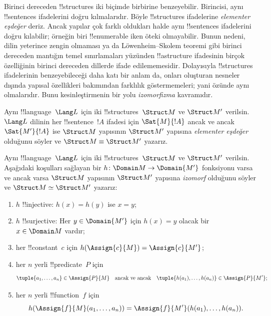 \documentclass[../../../include/open-logic-section]{subfiles}
\begin{document}

Birinci dereceden !!{structure}s iki biçimde birbirine benzeyebilir.
Birincisi, aynı !!{sentence}s ifadelerini doğru kılmalarıdır. Böyle
!!{structure}s ifadelerine \emph{elementer eşdeğer} deriz. Ancak yapılar
çok farklı oldukları halde aynı !!{sentence}s ifadelerini doğru
kılabilir; örneğin biri !!{enumerable} iken öteki olmayabilir. Bunun
nedeni, dilin yeterince zengin olmaması ya da Löwenheim--Skolem teoremi
gibi birinci dereceden mantığın temel sınırlamaları yüzünden
!!a{structure} ifadesinin birçok özelliğinin birinci dereceden dillerde
ifade edilememesidir. Dolayısıyla !!{structure}s ifadelerinin
benzeyebileceği daha katı bir anlam da, onları oluşturan nesneler
dışında yapısal özellikleri bakımından farklılık göstermemeleri; yani
özünde aynı olmalarıdır. Bunu kesinleştirmenin bir yolu
\emph{izomorfizma} kavramıdır.

\begin{defn}
Aynı !!{language}~$\Lang L$ için iki !!{structure}s~$\Struct M$ ve
$\Struct M'$ verilsin. $\Lang L$ dilinin her !!{sentence}~$!A$ ifadesi
için $\Sat{M}{!A}$ ancak ve ancak $\Sat{M'}{!A}$ ise $\Struct M$
yapısının $\Struct M'$ yapısına \emph{elementer eşdeğer} olduğunu
söyler ve $\Struct M\equiv\Struct M'$ yazarız.
\end{defn}

\begin{defn}
Aynı !!{language}~$\Lang L$ için iki !!{structure}s~$\Struct M$ ve
$\Struct M'$ verilsin. Aşağıdaki koşulları sağlayan bir
$h\colon\Domain M\to\Domain{M'}$ fonksiyonu varsa ve ancak varsa
$\Struct M$ yapısının $\Struct M'$ yapısına \emph{izomorf} olduğunu
söyler ve $\Struct M\simeq\Struct M'$ yazarız:
\begin{enumerate}
\item $h$ !!{injective}: $h(x)=h(y)$ ise $x=y$;
\item $h$ !!{surjective}: Her $y\in\Domain{M'}$ için $h(x)=y$ olacak
  bir $x\in\Domain M$ vardır;
\item {}her !!{constant}~$c$ için
  $h(\Assign{c}{M})=\Assign{c}{M'}$;
\item {}her $n$ yerli !!{predicate}~$P$ için
  \[
  \tuple{a_1, \dots, a_n}\in \Assign{P}{M} \quad\text{ancak ve ancak}\quad
  \tuple{h(a_1), \dots, h(a_n)} \in \Assign{P}{M'};
  \]
\item {}her $n$ yerli !!{function}~$f$ için
  \[
  h(\Assign{f}{M}(a_1, \dots, a_n)) =
  \Assign{f}{M'}(h(a_1), \dots, h(a_n)).
  \]
\end{enumerate}
\end{defn}
\end{document}
